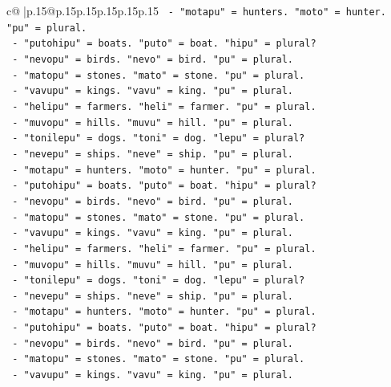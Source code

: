 \documentclass{article}
\begin{document}
{\begin{supertabular}{c@{$\;$}|p{.15\linewidth}@{}p{.15\linewidth}p{.15\linewidth}p{.15\linewidth}p{.15\linewidth}p{.15\linewidth}}
{{{\texttt{        {-} "motapu" = hunters. "moto" = hunter. "pu" = plural.} \\
\texttt{        {-} "putohipu" = boats. "puto" = boat. "hipu" = plural?} \\
\texttt{        {-} "nevopu" = birds. "nevo" = bird. "pu" = plural.} \\
\texttt{        {-} "matopu" = stones. "mato" = stone. "pu" = plural.} \\
\texttt{        {-} "vavupu" = kings. "vavu" = king. "pu" = plural.} \\
\texttt{        {-} "helipu" = farmers. "heli" = farmer. "pu" = plural.} \\
\texttt{        {-} "muvopu" = hills. "muvu" = hill. "pu" = plural.} \\
\texttt{        {-} "tonilepu" = dogs. "toni" = dog. "lepu" = plural?} \\
\texttt{        {-} "nevepu" = ships. "neve" = ship. "pu" = plural.} \\
\texttt{        {-} "motapu" = hunters. "moto" = hunter. "pu" = plural.} \\
\texttt{        {-} "putohipu" = boats. "puto" = boat. "hipu" = plural?} \\
\texttt{        {-} "nevopu" = birds. "nevo" = bird. "pu" = plural.} \\
\texttt{        {-} "matopu" = stones. "mato" = stone. "pu" = plural.} \\
\texttt{        {-} "vavupu" = kings. "vavu" = king. "pu" = plural.} \\
\texttt{        {-} "helipu" = farmers. "heli" = farmer. "pu" = plural.} \\
\texttt{        {-} "muvopu" = hills. "muvu" = hill. "pu" = plural.} \\
\texttt{        {-} "tonilepu" = dogs. "toni" = dog. "lepu" = plural?} \\
\texttt{        {-} "nevepu" = ships. "neve" = ship. "pu" = plural.} \\
\texttt{        {-} "motapu" = hunters. "moto" = hunter. "pu" = plural.} \\
\texttt{        {-} "putohipu" = boats. "puto" = boat. "hipu" = plural?} \\
\texttt{        {-} "nevopu" = birds. "nevo" = bird. "pu" = plural.} \\
\texttt{        {-} "matopu" = stones. "mato" = stone. "pu" = plural.} \\
\texttt{        {-} "vavupu" = kings. "vavu" = king. "pu" = plural.} \\
}}}
\end{supertabular}}
\end{document}
